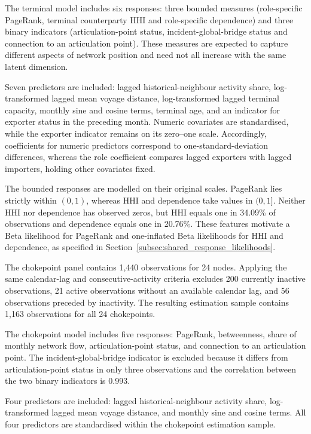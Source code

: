 \documentclass[pdftex,12pt,openright,a4paper,oneside]{book}
\begin{document}
The terminal model includes six responses:
three bounded measures (role-specific PageRank,
terminal counterparty HHI and role-specific dependence)
and three binary indicators (articulation-point status,
incident-global-bridge status and connection to an
articulation point). These measures are expected to capture different
aspects of network position and need not all increase
with the same latent dimension.

Seven predictors are included: lagged
historical-neighbour activity share, log-transformed
lagged mean voyage distance, log-transformed
lagged terminal capacity, monthly sine and cosine terms,
terminal age, and an indicator for exporter status
in the preceding month. Numeric covariates are
standardised, while the exporter indicator
remains on its zero--one scale. Accordingly,
coefficients for numeric predictors correspond
to one-standard-deviation differences, whereas
the role coefficient compares lagged exporters
with lagged importers, holding other covariates fixed.

The bounded responses are modelled on their original
scales. PageRank lies strictly within $(0,1)$,
whereas HHI and dependence take values in $(0,1]$.
Neither HHI nor dependence has observed zeros,
but HHI equals one in 34.09\% of observations
and dependence equals one in 20.76\%.
These features motivate a Beta likelihood for
PageRank and one-inflated Beta likelihoods for
HHI and dependence, as specified in
Section~\ref{subsec:shared_response_likelihoods}.

The chokepoint panel contains 1,440 observations
for 24 nodes. Applying the same calendar-lag
and consecutive-activity criteria excludes
200 currently inactive observations, 21 active
observations without an available calendar lag,
and 56 observations preceded by inactivity.
The resulting estimation sample contains
1,163 observations for all 24 chokepoints.

The chokepoint model includes five responses:
PageRank, betweenness, share of monthly network
flow, articulation-point status, and connection
to an articulation point. The incident-global-bridge
indicator is excluded because it differs from
articulation-point status in only three observations
and the correlation between the two binary indicators is 0.993.

Four predictors are included: lagged
historical-neighbour activity share, log-transformed
lagged mean voyage distance, and monthly sine and cosine
terms. All four predictors are standardised within the
chokepoint estimation sample.
\end{document}
